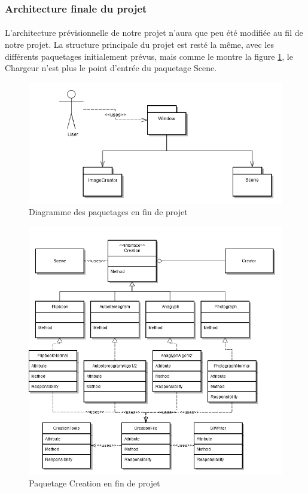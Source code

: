 \subsubsection{Architecture finale du projet}
\paragraph{}
L'architecture prévisionnelle de notre projet n'aura que peu été modifiée au fil de notre projet. La structure principale du projet est resté la même, avec les différents paquetages initialement prévus, mais comme le montre la figure \ref{fig:archi}, le Chargeur n'est plus le point d'entrée du paquetage Scene.

\begin{figure}[h]
		\centering
        \includegraphics[scale=0.4]{paquetages.png}
		\caption{\label{fig:archi} Diagramme des paquetages en fin de projet \protect \footnotemark}
\end{figure}

\begin{figure}[h]
		\centering
		\includegraphics[scale=0.4]{f_creation.png}
		\caption{\label{fig:creation} Paquetage Creation en fin de projet \protect \footnotemark}
\end{figure}

